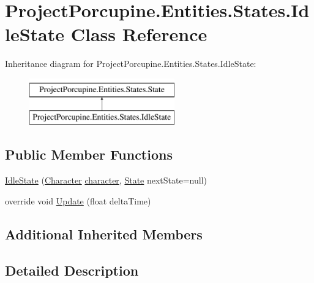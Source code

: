 \hypertarget{class_project_porcupine_1_1_entities_1_1_states_1_1_idle_state}{}\section{Project\+Porcupine.\+Entities.\+States.\+Idle\+State Class Reference}
\label{class_project_porcupine_1_1_entities_1_1_states_1_1_idle_state}
Inheritance diagram for Project\+Porcupine.\+Entities.\+States.\+Idle\+State\+:\begin{figure}[H]
\begin{center}
\leavevmode
\includegraphics[height=2.000000cm]{class_project_porcupine_1_1_entities_1_1_states_1_1_idle_state}
\end{center}
\end{figure}
\subsection*{Public Member Functions}
\begin{DoxyCompactItemize}
\item 
\hyperlink{class_project_porcupine_1_1_entities_1_1_states_1_1_idle_state_a8a5afae9ecdc2722dfd580958d130b94}{Idle\+State} (\hyperlink{class_project_porcupine_1_1_entities_1_1_character}{Character} \hyperlink{class_project_porcupine_1_1_entities_1_1_states_1_1_state_a0647dd5dacc8fba22b1c462c954180c7}{character}, \hyperlink{class_project_porcupine_1_1_entities_1_1_states_1_1_state}{State} next\+State=null)
\item 
override void \hyperlink{class_project_porcupine_1_1_entities_1_1_states_1_1_idle_state_acb8508997e5c56a5da15c054a4b691a3}{Update} (float delta\+Time)
\end{DoxyCompactItemize}
\subsection*{Additional Inherited Members}


\subsection{Detailed Description}


